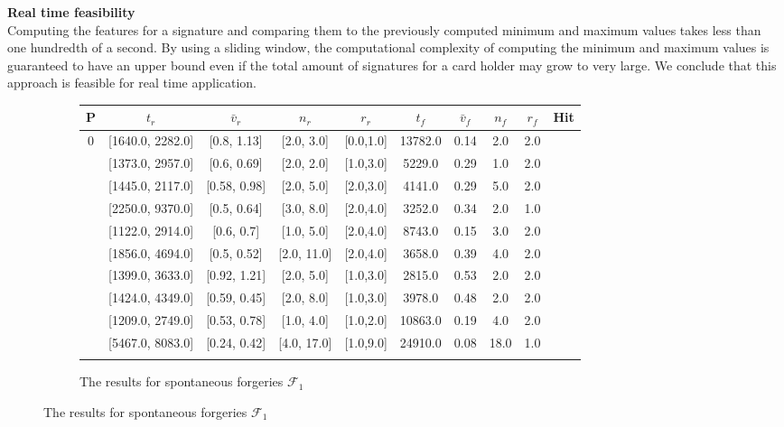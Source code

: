 \documentclass[a4paper, oneside]{csthesis}
\newcommand{\cmark}{\ding{51}}%
\newcommand{\xmark}{\ding{55}}%
\begin{document}
\textbf{Real time feasibility}\\
Computing the features for a signature and comparing them to the previously computed minimum and maximum values takes less than one hundredth of a second. By using a sliding window, the computational complexity of computing the minimum and maximum values is guaranteed to have an upper bound even if the total amount of signatures for a card holder may grow to very large. We conclude that this approach is feasible for real time application.

\begin{figure}
    \centering
    \begin{subfigure}[b]{\textwidth}
            \centering
            \tabcolsep 4pt
            \small
            \begin{tabular}{c|cccc||cccc||c}
            \hline
            \textbf{P} & $t_r$ & $\bar{v}_r$ & $n_r$ & $r_r$ & $t_f$ & $\bar{v}_f$ & $n_f$ & $r_f$ & Hit \\
            \hline
            0 & [1640.0, 2282.0] & [0.8, 1.13] & [2.0, 3.0] & [0.0,1.0] & 13782.0 & 0.14 & 2.0 & 2.0 & \xmark \\ \hdashline[0.5pt/3pt]
            1 & [1373.0, 2957.0] & [0.6, 0.69] & [2.0, 2.0] & [1.0,3.0] & 5229.0 & 0.29 & 1.0 & 2.0 & \xmark\\ \hdashline[0.5pt/3pt]
            2 & [1445.0, 2117.0] & [0.58, 0.98] & [2.0, 5.0] & [2.0,3.0] & 4141.0 & 0.29 & 5.0 & 2.0 & \xmark\\ \hdashline[0.5pt/3pt]
            3 & [2250.0, 9370.0] & [0.5, 0.64] & [3.0, 8.0] & [2.0,4.0] & 3252.0 & 0.34 & 2.0 & 1.0 & \xmark \\ \hdashline[0.5pt/3pt]
            4 & [1122.0, 2914.0] & [0.6, 0.7] & [1.0, 5.0] & [2.0,4.0] & 8743.0 & 0.15 & 3.0 & 2.0 & \xmark \\ \hdashline[0.5pt/3pt]
            5 & [1856.0, 4694.0] & [0.5, 0.52] & [2.0, 11.0] & [2.0,4.0] & 3658.0 & 0.39 & 4.0 & 2.0 & \xmark \\ \hdashline[0.5pt/3pt]
            6 & [1399.0, 3633.0] & [0.92, 1.21] & [2.0, 5.0] & [1.0,3.0] & 2815.0 & 0.53 & 2.0 & 2.0 & \xmark \\ \hdashline[0.5pt/3pt]
            7 & [1424.0, 4349.0] & [0.59, 0.45] & [2.0, 8.0] & [1.0,3.0] & 3978.0 & 0.48 & 2.0 & 2.0 & \cmark \\ \hdashline[0.5pt/3pt]
            8 & [1209.0, 2749.0] & [0.53, 0.78] & [1.0, 4.0] & [1.0,2.0] & 10863.0 & 0.19 & 4.0 & 2.0 & \xmark \\ \hdashline[0.5pt/3pt]
            9 & [5467.0, 8083.0] & [0.24, 0.42] & [4.0, 17.0] & [1.0,9.0] & 24910.0 & 0.08 & 18.0 & 1.0 & \xmark \\ \hdashline[0.5pt/3pt]
            \hline
            \end{tabular}
            \caption{The results for spontaneous forgeries $\mathcal{F}_1$}
            \label{tbl:global-features-forg-spontaneous}
    \end{subfigure}%


\end{figure}
\end{document}
